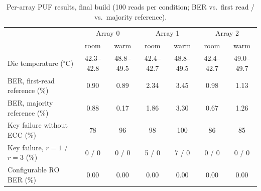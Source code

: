 \documentclass[11pt,a4paper]{article}
\begin{document}
\begin{table}[H]\centering\small
\caption{Per-array PUF results, final build (100 reads per condition; BER vs.\ first read / vs.\ majority reference).}\label{tab:perarray}
\begin{tabular}{@{}lcccccc@{}}
\toprule
 & \multicolumn{2}{c}{Array 0} & \multicolumn{2}{c}{Array 1} & \multicolumn{2}{c}{Array 2}\\
 & room & warm & room & warm & room & warm\\
\midrule
Die temperature ($^\circ$C) & 42.3--42.8 & 48.8--49.5 & 42.4--42.7 & 48.8--49.5 & 42.4--42.7 & 49.0--49.7\\
BER, first-read reference (\%) & 0.90 & 0.89 & 2.34 & 3.45 & 0.98 & 1.13\\
BER, majority reference (\%) & 0.88 & 0.17 & 1.86 & 3.30 & 0.67 & 1.26\\
Key failure without ECC (\%) & 78 & 96 & 98 & 100 & 86 & 85\\
Key failure, $r=1$ / $r=3$ (\%) & 0 / 0 & 0 / 0 & 5 / 0 & 7 / 0 & 0 / 0 & 0 / 0\\
Configurable RO BER (\%) & 0.00 & 0.00 & 0.00 & 0.00 & 0.00 & 0.00\\
\bottomrule
\end{tabular}
\end{table}
\end{document}
